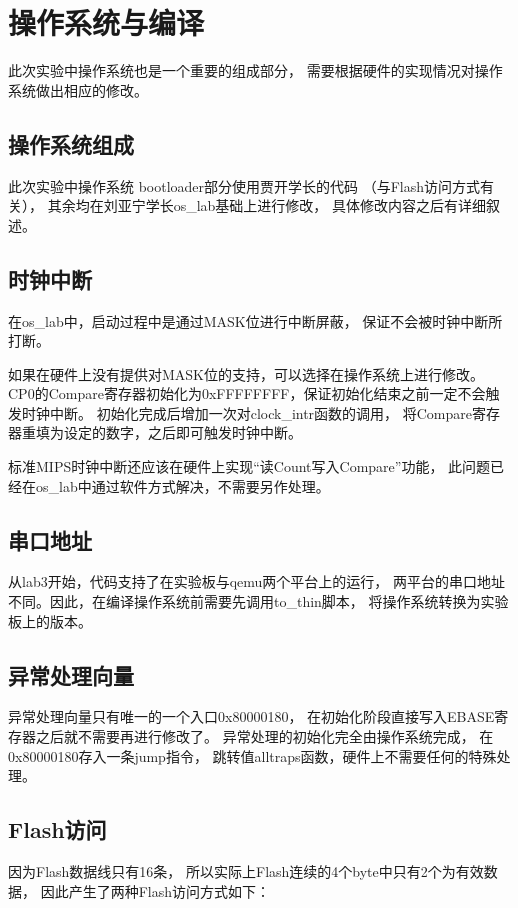 \section{操作系统与编译}
    此次实验中操作系统也是一个重要的组成部分，%
    需要根据硬件的实现情况对操作系统做出相应的修改。%

        \subsection{操作系统组成}
            此次实验中操作系统%
            bootloader部分使用贾开学长的代码%
            （与Flash访问方式有关），%
            其余均在刘亚宁学长os\_lab基础上进行修改，%
            具体修改内容之后有详细叙述。

        \subsection{时钟中断}
            在os\_lab中，启动过程中是通过MASK位进行中断屏蔽，%
            保证不会被时钟中断所打断。

            如果在硬件上没有提供对MASK位的支持，可以选择在操作系统上进行修改。%
            CP0的Compare寄存器初始化为0xFFFFFFFF，保证初始化结束之前一定不会触发时钟中断。%
            初始化完成后增加一次对clock\_intr函数的调用，%
            将Compare寄存器重填为设定的数字，之后即可触发时钟中断。

            标准MIPS时钟中断还应该在硬件上实现“读Count写入Compare”功能，%
            此问题已经在os\_lab中通过软件方式解决，不需要另作处理。

        \subsection{串口地址}
            从lab3开始，代码支持了在实验板与qemu两个平台上的运行，%
            两平台的串口地址不同。因此，在编译操作系统前需要先调用to\_thin脚本，%
            将操作系统转换为实验板上的版本。

        \subsection{异常处理向量}
            异常处理向量只有唯一的一个入口0x80000180，%
            在初始化阶段直接写入EBASE寄存器之后就不需要再进行修改了。%
            异常处理的初始化完全由操作系统完成，%
            在0x80000180存入一条jump指令，%
            跳转值alltraps函数，硬件上不需要任何的特殊处理。%

        \subsection{Flash访问}
            因为Flash数据线只有16条，%
            所以实际上Flash连续的4个byte中只有2个为有效数据，%
            因此产生了两种Flash访问方式如下：

